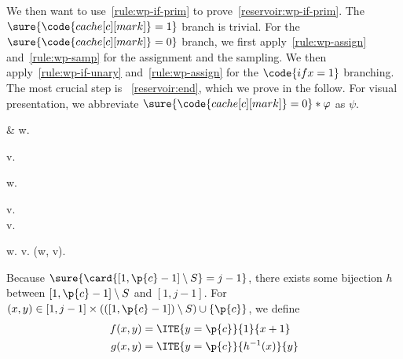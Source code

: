 We then want to use~\ref{rule:wp-if-prim} to prove~\eqref{reservoir:wp-if-prim}.
The $\sure{\code{cache[c][mark]} = 1}$ branch is trivial.
For the $\sure{\code{cache[c][mark]} = 0}$ branch,
we first apply~\ref{rule:wp-assign} and~\ref{rule:wp-samp} for the assignment and
the sampling. We then apply~\ref{rule:wp-if-unary} and~\ref{rule:wp-assign}
for the $\code{if x = 1}$ branching.
The most crucial step is ~\eqref{reservoir:end}, which we prove in the follow.
For visual presentation,
we abbreviate $\sure{\code{cache[c][mark]} = 0} \ast \varphi$ as $\psi$.
\begin{eqexplain}
&\CMod{\Unif{[1, j]}} w.
              \begin{grp}
                 \implies {} v.\\
                 \implies {}
              \end{grp}
              \ast \psi
              \ast {}
      \whichproves
\CMod{\Unif{[1, j]}} w.
              \begin{grp}
                 \implies {} v.\\
                 \implies {} v. 
              \end{grp}
              \ast \psi
              \ast {}
      \whichproves
\CMod{\Unif{[1, j]}} w.
               v. 
              \ast \psi
              \ast {}
      \whichproves
{} (w, v).  
              \ast \psi
              \ast {}
\end{eqexplain}
Because  $\sure{\card{[1, \p{c} - 1] \setminus S} = j - 1}$,
there exists some bijection $h$ between $[1, \p{c} - 1] \setminus S$
and $[1, j-1]$.
For $(x, y) \in [1, j - 1] \times (([1, \p{c} - 1]) \setminus S) \cup \{\p{c}\}$,
we define
\begin{align*}
f(x, y) &= \ITE{y = \p{c}}{1}{x + 1} \\
g(x, y) &= \ITE{y = \p{c}}{h^{-1}(x)}{y}
\end{align*}
